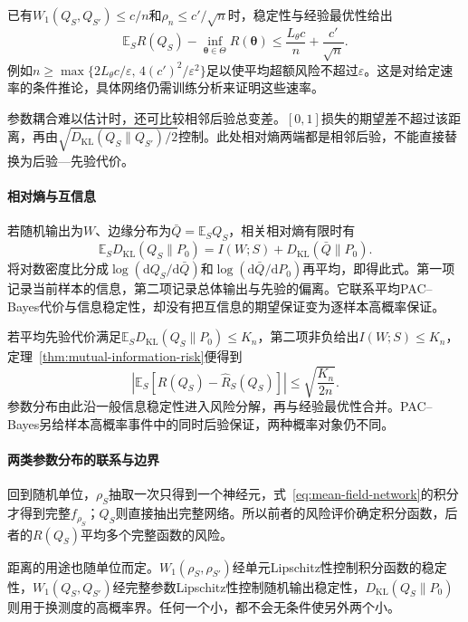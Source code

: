 已有$W_1(Q_S,Q_{S'})\leq c/n$和$\rho_n\leq c'/\sqrt n$时，稳定性与经验最优性给出
\[
 \mathbb E_S R(Q_S)-\inf_{\bm\theta\in\Theta}R(\bm\theta)
 \leq\frac{L_\theta c}{n}+\frac{c'}{\sqrt n}.
\]
例如$n\geq\max\{2L_\theta c/\varepsilon,\,4(c')^2/\varepsilon^2\}$足以使平均超额风险不超过$\varepsilon$。这是对给定速率的条件推论，具体网络仍需训练分析来证明这些速率。

参数耦合难以估计时，还可比较相邻后验总变差。$[0,1]$损失的期望差不超过该距离，再由$\sqrt{D_{\mathrm{KL}}(Q_S\|Q_{S'})/2}$控制。此处相对熵两端都是相邻后验，不能直接替换为后验—先验代价。

\paragraph{相对熵与互信息}

若随机输出为$W$、边缘分布为$\bar Q=\mathbb E_SQ_S$，相关相对熵有限时有
\begin{equation}
 \mathbb E_SD_{\mathrm{KL}}(Q_S\|P_0)
 =I(W;S)+D_{\mathrm{KL}}(\bar Q\|P_0).
 \label{eq:pac-bayes-information-decomposition}
\end{equation}
将对数密度比分成$\log(\mathrm dQ_S/\mathrm d\bar Q)$和$\log(\mathrm d\bar Q/\mathrm dP_0)$再平均，即得此式。第一项记录当前样本的信息，第二项记录总体输出与先验的偏离。它联系平均PAC--Bayes代价与信息稳定性，却没有把互信息的期望保证变为逐样本高概率保证。

若平均先验代价满足$\mathbb E_SD_{\mathrm{KL}}(Q_S\|P_0)\leq K_n$，第二项非负给出$I(W;S)\leq K_n$，定理~\ref{thm:mutual-information-risk}便得到
\[
 \left|\mathbb E_S[R(Q_S)-\hat R_S(Q_S)]\right|
 \leq\sqrt{\frac{K_n}{2n}}.
\]
参数分布由此沿一般信息稳定性进入风险分解，再与经验最优性合并。PAC--Bayes另给样本高概率事件中的同时后验保证，两种概率对象仍不同。

\paragraph{两类参数分布的联系与边界}

回到随机单位，$\rho_S$抽取一次只得到一个神经元，式~\eqref{eq:mean-field-network}的积分才得到完整$f_{\rho_S}$；$Q_S$则直接抽出完整网络。所以前者的风险评价确定积分函数，后者的$R(Q_S)$平均多个完整函数的风险。

距离的用途也随单位而定。$W_1(\rho_S,\rho_{S'})$经单元Lipschitz性控制积分函数的稳定性，$W_1(Q_S,Q_{S'})$经完整参数Lipschitz性控制随机输出稳定性，$D_{\mathrm{KL}}(Q_S\|P_0)$则用于换测度的高概率界。任何一个小，都不会无条件使另外两个小。

